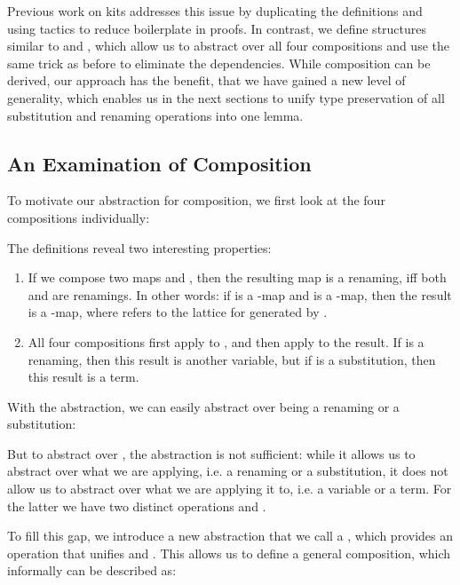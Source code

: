 \documentclass[a4paper, UKenglish, cleveref, autoref, thm-restate]{lipics-v2021}
\newenvironment{ExampleCode*}{%
  \begin{tcolorbox}[%
    colframe=white,%
    colback=yellow!5,%
    boxrule=0.0pt,%
    top=2.5pt,%
    left=2.5pt,%
    bottom=2.5pt,%
    right=2.5pt,%
    boxsep=0pt%
  ]\vspace{-0.2\baselineskip}%
}{%
  \vspace{-1\baselineskip}%
  \end{tcolorbox}%
}
\newcommand*\ExampleCode[1]{\begin{ExampleCode*}{#1}\end{ExampleCode*}}
\newcommand*\ACode[1]{\AgdaFontStyle{\textcolor{mygray}{#1}}}
\newcommand*\AField[1]{\AgdaField{#1}}
\newcommand*\ACon[1]{\AgdaInductiveConstructor{#1}}
\newcommand*\ADef[1]{\AgdaFunction{#1}}
\begin{document}
  Previous work on kits\cite{DBLP:journals/jar/BentonHKM12} addresses this
  issue by duplicating the definitions and using tactics to reduce
  boilerplate in proofs.
  In contrast, we define structures similar to \ACode{\ACon{Kit}} and
  \ACode{\ACon{Traversal}}, which allow us to abstract over all four
  compositions and use the same trick as before to eliminate the
  dependencies.
  While composition can be derived, our approach has the benefit, that
  we have gained a new level of generality, which enables us in the next
  sections to unify type preservation of all substitution and renaming
  operations into one lemma.

  \subsection{An Examination of Composition}
  \label{sec:composition:example}
  To motivate our abstraction for composition, we first look
  at the four compositions individually:
  \ExampleCode\KExFourComps
  The definitions reveal two interesting properties:
  \begin{enumerate}
  \item
    If we compose two maps \ACode{ϕ₁} and \ACode{ϕ₂}, then the
    resulting map is a renaming, iff both \ACode{ϕ₁} and \ACode{ϕ₂} are
    renamings.
    In other words:
    if \ACode{ϕ₁} is a \ACode{K₁}-map and \ACode{ϕ₂} is a \ACode{K₂}-map,
    then the result is a \ACode{(K₁ ⊔ K₂)}-map, where \ACode{⊔} refers to the
    lattice for \ACode{\{ \ADef{Kᵣ} , \ADef{Kₛ} \}}
    generated by \ACode{\ADef{Kᵣ} < \ADef{Kₛ}}.
  \item
    All four compositions first apply \ACode{ϕ₁} to \ACode{x},
    and then apply \ACode{ϕ₂} to the result.
    If \ACode{ϕ₁} is a renaming, then this result is another variable, but
    if \ACode{ϕ₁} is a substitution, then this result is a term.
  \end{enumerate}
  With the \ACode{\ACon{Kit}} abstraction, we can easily abstract over
  \ACode{ϕ₂} being a renaming or a substitution:
  \ExampleCode\KExTwoComps

  But to abstract over \ACode{ϕ₁}, the \ACode{\ACon{Kit}} abstraction
  is not sufficient: while it allows us to abstract over what we are applying, i.e.
  a renaming or a substitution, it does not allow us to
  abstract over what we are applying it to, i.e. a variable or a term.
  For the latter we have two distinct operations \ACode{\ADef{\_\&\_}}
  and \ACode{\ADef{\_⋯\_}}.

  To fill this gap, we introduce a new abstraction that we call a
  \ACode{\ACon{CKit}},
  which provides an operation \ACode{\AField{\_\&/⋯\_}} that unifies
  \ACode{\ADef{\_\&\_}} and \ACode{\ADef{\_⋯\_}}. This allows us to
  define a general composition, which informally can be described as:
  \ExampleCode\KComposition
\end{document}
